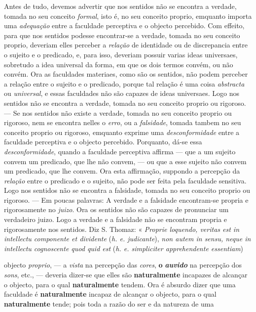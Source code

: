 Antes de tudo, devemos advertir que nos sentidos não se encontra a verdade, tomada no seu conceito \emph{formal}, isto é, no seu conceito proprio, emquanto importa uma \emph{adequação} entre a faculdade perceptiva e o objecto percebido. Com effeito, para que nos sentidos podesse encontrar-se a verdade, tomada no seu conceito proprio, deveriam elles perceber a \emph{relação} de identidade ou de discrepancia entre o sujeito e o predicado, e, para isso, deveriam possuir varias ideas universaes, sobretudo a idea universal da forma, em que os dois termos convém, ou não convém. Ora as faculdades materiaes, como são os sentidos, não podem perceber a relação entre o sujeito e o predicado, porque tal relação é uma coisa \emph{abstracta} ou \emph{universal}, e essas faculdades não são capazes de ideas universaes. Logo nos sentidos não se encontra a verdade, tomada no seu conceito proprio ou rigoroso. --- Se nos sentidos não existe a verdade, tomada no seu conceito proprio ou rigoroso, nem se encontra nelles o \emph{erro}, ou a \emph{falsidade}, tomada tambem no seu conceito proprio ou rigoroso, emquanto exprime uma \emph{desconformidade} entre a faculdade perceptiva e o objecto percebido. Porquanto, dá-se essa \emph{desconformidade}, quando a faculdade perceptiva affirma --- que a um sujeito convem um predicado, que lhe não convem, --- ou que a esse sujeito não convem um predicado, que lhe convem. Ora esta affirmação, suppondo a percepção da \emph{relação} entre o predicado e o sujeito, não pode ser feita pela faculdade sensitiva. Logo nos sentidos não se encontra a falsidade, tomada no seu conceito proprio ou rigoroso. --- Em poucas palavras: A verdade e a falsidade encontram-se propria e rigorosamente no \emph{juizo}. Ora os sentidos não são capazes de pronunciar um verdadeiro juizo. Logo a verdade e a falsidade não se encontram propria e rigorosamente nos sentidos. Diz S. Thomaz: « \emph{Proprie loquendo, veritas est in intellectu componente et dividente} (\emph{h. e. judicante}), \emph{non autem in sensu, neque in intellectu cognoscente quod quid est} (\emph{h. e. simpliciter apprehendente essentiam})

objecto \emph{proprio}, --- a \emph{vista} na percepção das \emph{cores}, \textbf{o} \textbf{\emph{auvido}} na percepção dos \emph{sons}, etc., --- deveria dizer-se que elles são \textbf{naturalmente} incapazes de alcançar o objecto, para o qual \textbf{naturalmente} tendem. Ora é absurdo dizer que uma faculdade é \textbf{naturalmente} incapaz de alcançar o objecto, para o qual \textbf{naturalmente} tende; pois toda a razão do ser e da natureza de uma

